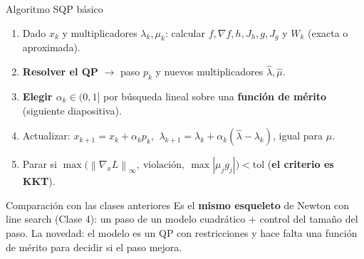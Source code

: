 \documentclass[aspectratio=169]{beamer}
\newcommand{\grad}{\nabla}
\newcommand{\norm}[1]{\left\lVert #1\right\rVert}
\begin{document}
\begin{frame}{Algoritmo SQP básico}
  \begin{enumerate}
    \item Dado $x_k$ y multiplicadores $\lambda_k,\mu_k$: calcular $f,\grad f,h,J_h,g,J_g$ y $W_k$ (exacta o aproximada).
    \item \textbf{Resolver el QP} $\to$ paso $p_k$ y nuevos multiplicadores $\hat\lambda,\hat\mu$.
    \item \textbf{Elegir $\alpha_k\in(0,1]$} por búsqueda lineal sobre una \textbf{función de mérito} (siguiente diapositiva).
    \item Actualizar: $x_{k+1}=x_k+\alpha_kp_k$, $\ \lambda_{k+1}=\lambda_k+\alpha_k(\hat\lambda-\lambda_k)$, igual para $\mu$.
    \item Parar si $\max\bigl(\norm{\grad_xL}_\infty,\ \text{violación},\ \max|\mu_jg_j|\bigr)<\text{tol}$ (\textbf{el criterio es KKT}).
  \end{enumerate}
  \begin{exampleblock}{Comparación con las clases anteriores}
    Es el \textbf{mismo esqueleto} de Newton con line search (Clase 4): un paso de un modelo cuadrático + control del tamaño del paso. La novedad: el modelo es un QP con restricciones y hace falta una función de mérito para decidir si el paso mejora.
  \end{exampleblock}
\end{frame}
\end{document}
